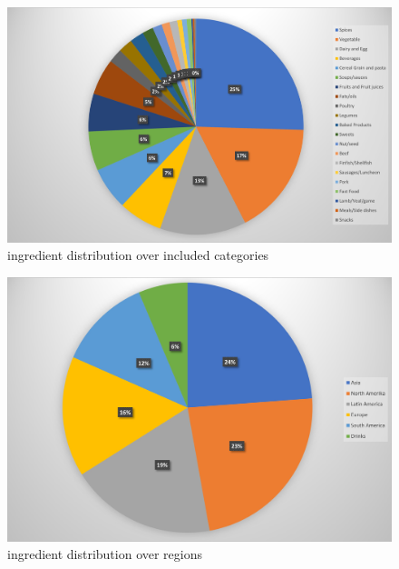 \begin{figure}
	\centering
	\includegraphics[scale=0.5]{Figures/ingredient_distribution.jpg}
	\caption[Ingredient Distribution]{ingredient distribution over included categories}\label{fig:ing_dist}
\end{figure}
\begin{figure}
	\centering
	\includegraphics[scale=0.5]{Figures/region_distribution.jpg}
	\caption[Region Distribution]{ingredient distribution over regions}\label{fig:reg_dist}
\end{figure}

